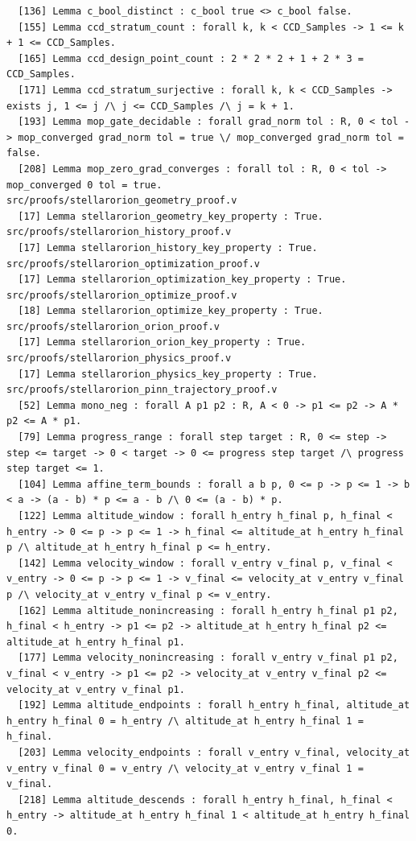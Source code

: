 \documentclass[11pt]{article}
\theoremstyle{definition}
\begin{document}
\begin{verbatim}
  [136] Lemma c_bool_distinct : c_bool true <> c_bool false.
  [155] Lemma ccd_stratum_count : forall k, k < CCD_Samples -> 1 <= k + 1 <= CCD_Samples.
  [165] Lemma ccd_design_point_count : 2 * 2 * 2 + 1 + 2 * 3 = CCD_Samples.
  [171] Lemma ccd_stratum_surjective : forall k, k < CCD_Samples -> exists j, 1 <= j /\ j <= CCD_Samples /\ j = k + 1.
  [193] Lemma mop_gate_decidable : forall grad_norm tol : R, 0 < tol -> mop_converged grad_norm tol = true \/ mop_converged grad_norm tol = false.
  [208] Lemma mop_zero_grad_converges : forall tol : R, 0 < tol -> mop_converged 0 tol = true.
src/proofs/stellarorion_geometry_proof.v
  [17] Lemma stellarorion_geometry_key_property : True.
src/proofs/stellarorion_history_proof.v
  [17] Lemma stellarorion_history_key_property : True.
src/proofs/stellarorion_optimization_proof.v
  [17] Lemma stellarorion_optimization_key_property : True.
src/proofs/stellarorion_optimize_proof.v
  [18] Lemma stellarorion_optimize_key_property : True.
src/proofs/stellarorion_orion_proof.v
  [17] Lemma stellarorion_orion_key_property : True.
src/proofs/stellarorion_physics_proof.v
  [17] Lemma stellarorion_physics_key_property : True.
src/proofs/stellarorion_pinn_trajectory_proof.v
  [52] Lemma mono_neg : forall A p1 p2 : R, A < 0 -> p1 <= p2 -> A * p2 <= A * p1.
  [79] Lemma progress_range : forall step target : R, 0 <= step -> step <= target -> 0 < target -> 0 <= progress step target /\ progress step target <= 1.
  [104] Lemma affine_term_bounds : forall a b p, 0 <= p -> p <= 1 -> b < a -> (a - b) * p <= a - b /\ 0 <= (a - b) * p.
  [122] Lemma altitude_window : forall h_entry h_final p, h_final < h_entry -> 0 <= p -> p <= 1 -> h_final <= altitude_at h_entry h_final p /\ altitude_at h_entry h_final p <= h_entry.
  [142] Lemma velocity_window : forall v_entry v_final p, v_final < v_entry -> 0 <= p -> p <= 1 -> v_final <= velocity_at v_entry v_final p /\ velocity_at v_entry v_final p <= v_entry.
  [162] Lemma altitude_nonincreasing : forall h_entry h_final p1 p2, h_final < h_entry -> p1 <= p2 -> altitude_at h_entry h_final p2 <= altitude_at h_entry h_final p1.
  [177] Lemma velocity_nonincreasing : forall v_entry v_final p1 p2, v_final < v_entry -> p1 <= p2 -> velocity_at v_entry v_final p2 <= velocity_at v_entry v_final p1.
  [192] Lemma altitude_endpoints : forall h_entry h_final, altitude_at h_entry h_final 0 = h_entry /\ altitude_at h_entry h_final 1 = h_final.
  [203] Lemma velocity_endpoints : forall v_entry v_final, velocity_at v_entry v_final 0 = v_entry /\ velocity_at v_entry v_final 1 = v_final.
  [218] Lemma altitude_descends : forall h_entry h_final, h_final < h_entry -> altitude_at h_entry h_final 1 < altitude_at h_entry h_final 0.

\end{verbatim}
\end{document}

